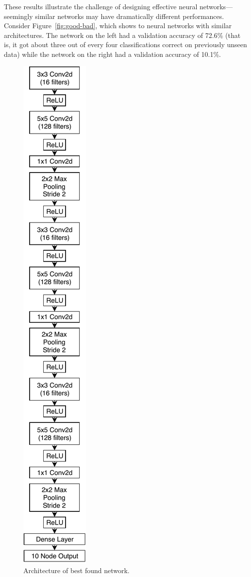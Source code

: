 \documentclass[conference]{IEEEtran}
\begin{document}
These results illustrate the challenge of designing effective neural
networks---seemingly similar networks may have dramatically different
performances. Consider Figure~\ref{fig:good-bad}, which shows to neural
networks with similar architectures. The network on the left had a validation
accuracy of 72.6\% (that is, it got about three out of every four classifications
correct on previously unseen data) while the network on the right had a
validation accuracy of 10.1\%.

\begin{figure}
  \centering
  \includegraphics[height=.45\textheight]{img/best-model}
  \caption{Architecture of best found network.}
  \label{fig:best}
\end{figure}
\end{document}
